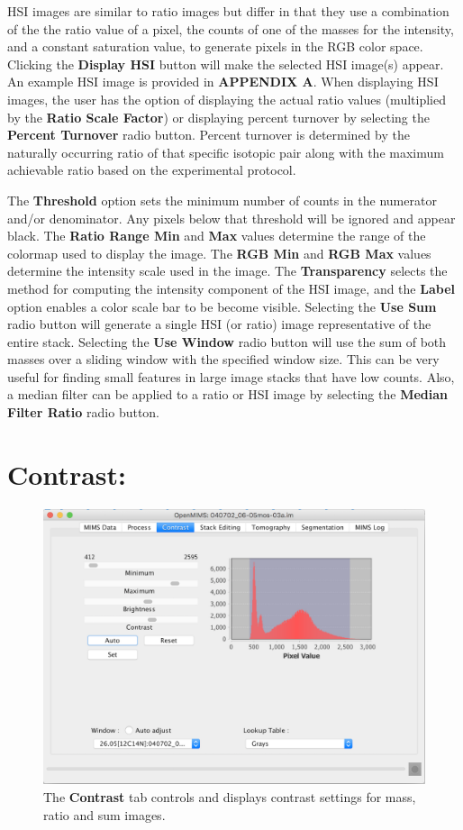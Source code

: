 \documentclass{article}
\begin{document}
	HSI images are similar to ratio images but differ
	in that they use a combination of the the ratio value of a pixel, the counts of one of 
	the masses for the intensity, and a constant saturation value, to generate pixels in the RGB 
	color space. Clicking the \textbf{Display HSI} button will make the selected HSI image(s) appear. An example 
	HSI image is provided in \textbf{APPENDIX A}. When displaying HSI
	images, the user has the option of displaying the actual ratio values 
	(multiplied by the \textbf{Ratio Scale Factor}) or displaying percent turnover by selecting the 
	\textbf{Percent Turnover} radio button. Percent turnover is determined by the naturally occurring ratio
	of that specific isotopic pair along with the maximum achievable ratio based on the experimental protocol.

	The \textbf{Threshold} option sets the minimum number of counts in the numerator and/or 
	denominator. Any pixels below that threshold will be ignored and appear black.
	The \textbf{Ratio Range Min} and \textbf{Max} values determine the range of the colormap
	used to display the image. The \textbf{RGB Min} and \textbf{RGB Max} values determine
	the intensity scale used in the image. The \textbf{Transparency} selects the 
	method for computing the intensity component of the HSI image, and the \textbf{Label} 
	option enables a color scale bar to be become visible. Selecting the \textbf{Use Sum}
	radio button will generate a single HSI (or ratio) image representative of the entire stack. Selecting 
	the \textbf{Use Window} radio button will use the sum of both masses over a sliding window 
	with the specified window size. This can be very useful for finding small features in large image 
	stacks that have low counts. Also, a median filter 
	can be applied to a ratio or HSI image by selecting the \textbf{Median Filter Ratio} 
	radio button.


\newpage
\section*{Contrast:}
	
	\begin{figure}[ht]
	\centering
	\includegraphics[scale=0.70]{snapshot_MimsContrast.png}
	\caption{The \textbf{Contrast} tab controls and displays contrast settings for mass, ratio and sum images.}
	\end{figure}
	
\end{document}
